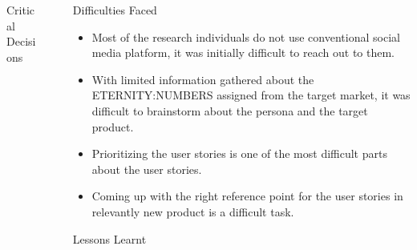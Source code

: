\documentclass[final]{beamer}
\newlength{\sepwid}
\newlength{\onecolwid}
\newlength{\twocolwid}
\begin{document}
\begin{frame}
\begin{columns}[t]
\begin{column}{\twocolwid}
\begin{columns}[t,totalwidth=\twocolwid]
\begin{column}{\onecolwid}
\begin{exampleblock}{Critical Decisions}
\end{exampleblock}


\end{column} %

\end{columns} %

\end{column} %

\begin{column}{\sepwid}\end{column} %

\begin{column}{\onecolwid} %


\begin{exampleblock}{Difficulties Faced}

\begin{itemize}
    \item Most of the research individuals do not use conventional social media platform, it was initially difficult to reach out to them.
    \item With limited information gathered about the ETERNITY:NUMBERS assigned from the target market, it was difficult to brainstorm about the persona and the target product.
    \item Prioritizing the user stories is one of the most difficult parts about the user stories.
    \item Coming up with the right reference point for the user stories in relevantly new product is a difficult task.
\end{itemize}

\end{exampleblock}


\begin{exampleblock}{Lessons Learnt}


\end{exampleblock}
\end{column}
\end{columns}
\end{frame}
\end{document}
